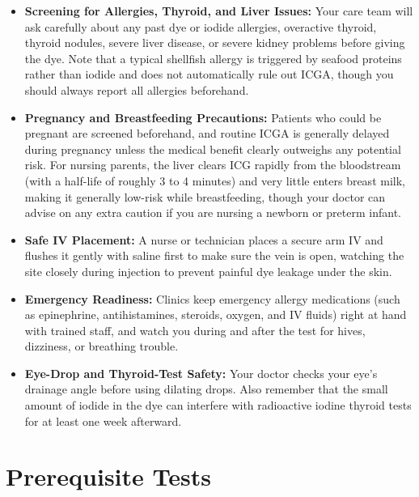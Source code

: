 \begin{itemize}
    \item \textbf{Screening for Allergies, Thyroid, and Liver Issues:} Your care team will ask carefully about any past dye or iodide allergies, overactive thyroid, thyroid nodules, severe liver disease, or severe kidney problems before giving the dye. Note that a typical shellfish allergy is triggered by seafood proteins rather than iodide and does not automatically rule out ICGA, though you should always report all allergies beforehand.
    \item \textbf{Pregnancy and Breastfeeding Precautions:} Patients who could be pregnant are screened beforehand, and routine ICGA is generally delayed during pregnancy unless the medical benefit clearly outweighs any potential risk. For nursing parents, the liver clears ICG rapidly from the bloodstream (with a half-life of roughly 3 to 4 minutes) and very little enters breast milk, making it generally low-risk while breastfeeding, though your doctor can advise on any extra caution if you are nursing a newborn or preterm infant.
    \item \textbf{Safe IV Placement:} A nurse or technician places a secure arm IV and flushes it gently with saline first to make sure the vein is open, watching the site closely during injection to prevent painful dye leakage under the skin.
    \item \textbf{Emergency Readiness:} Clinics keep emergency allergy medications (such as epinephrine, antihistamines, steroids, oxygen, and IV fluids) right at hand with trained staff, and watch you during and after the test for hives, dizziness, or breathing trouble.
    \item \textbf{Eye-Drop and Thyroid-Test Safety:} Your doctor checks your eye's drainage angle before using dilating drops. Also remember that the small amount of iodide in the dye can interfere with radioactive iodine thyroid tests for at least one week afterward.
\end{itemize}

\section{Prerequisite Tests}

